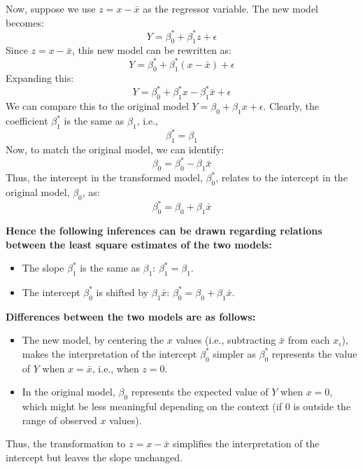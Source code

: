 \documentclass[a4paper,12pt,answers]{exam}
\begin{document}
\begin{questions}
\begin{solution}
Now, suppose we use $z = x - \bar{x}$ as the regressor variable. The new model becomes:
\[
Y = \beta_0^* + \beta_1^* z + \epsilon
\]
Since $z = x - \bar{x}$, this new model can be rewritten as:
\[
Y = \beta_0^* + \beta_1^* (x - \bar{x}) + \epsilon
\]
Expanding this:
\[
Y = \beta_0^* + \beta_1^* x - \beta_1^* \bar{x} + \epsilon
\]
We can compare this to the original model $Y = \beta_0 + \beta_1 x + \epsilon$. Clearly, the coefficient $\beta_1^*$ is the same as $\beta_1$, i.e.,
\[
\beta_1^* = \beta_1
\]
Now, to match the original model, we can identify:
\[
\beta_0 = \beta_0^* - \beta_1 \bar{x}
\]
Thus, the intercept in the transformed model, $\beta_0^*$, relates to the intercept in the original model, $\beta_0$, as:
\[
\beta_0^* = \beta_0 + \beta_1 \bar{x}
\]

\textbf{Hence the following inferences can be drawn regarding relations between the least square estimates of the two models: }
\begin{itemize}
    \item The slope $\beta_1^*$ is the same as $\beta_1$: $\beta_1^* = \beta_1$.
    \item The intercept $\beta_0^*$ is shifted by $\beta_1 \bar{x}$: $\beta_0^* = \beta_0 + \beta_1 \bar{x}$.
\end{itemize}
\textbf{Differences between the two models are as follows:}
\begin{itemize}
    \item The new model, by centering the $x$ values (i.e., subtracting $\bar{x}$ from each $x_i$), makes the interpretation of the intercept $\beta_0^*$ simpler as $\beta_0^*$ represents the value of $Y$ when $x = \bar{x}$, i.e., when $z = 0$.
    \item In the original model, $\beta_0$ represents the expected value of $Y$ when $x = 0$, which might be less meaningful depending on the context (if 0 is outside the range of observed $x$ values).
\end{itemize}

Thus, the transformation to $z = x - \bar{x}$ simplifies the interpretation of the intercept but leaves the slope unchanged.
\end{solution}
\end{questions}
\end{document}
